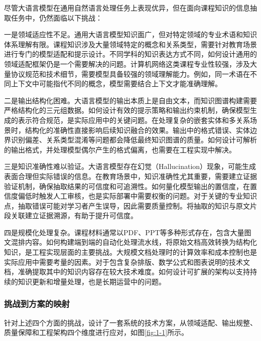 尽管大语言模型在通用自然语言处理任务上表现优异，但在面向课程知识的信息抽取任务中，仍然面临以下挑战：

一是领域适应性不足。通用大语言模型知识面广，但对特定领域的专业术语和知识体系理解有限。课程知识涉及大量领域特定的概念和关系类型，需要针对教育场景进行专门的模型适配和提示设计。不同学科的知识表达方式不同，如何设计通用的领域适配框架仍是一个需要解决的问题。计算机网络这类课程专业性较强，涉及大量协议规范和技术细节，需要模型具备较强的领域理解能力。例如，同一术语在不同上下文中可能指代不同的概念，模型需要结合上下文才能准确理解。

二是输出结构化困难。大语言模型的输出本质上是自由文本，而知识图谱构建需要严格结构化的三元组数据。如何设计有效的提示策略和输出约束机制，确保模型生成的表示符合规范，是实际应用中的关键问题。在处理复杂的嵌套实体和多关系场景时，结构化的准确性直接影响后续知识融合的效果。输出中的格式错误、实体边界识别偏差、关系类型混淆等问题都会降低最终知识图谱的质量。如何设计可解析的输出格式，并处理模型偶尔产生的格式偏离，也需要在工程实现中解决。

三是知识准确性难以验证。大语言模型存在幻觉（Hallucination）现象，可能生成表面合理但实际错误的信息。在教育场景中，知识准确性尤其重要，需要建立证据验证机制，确保抽取结果的可信度和可追溯性。如何量化模型输出的置信度，在置信度偏低时触发人工审核，也是实际部署中需要权衡的问题。对于关键的专业知识点，抽取错误可能对学习者产生误导，因此需要质量控制。将抽取的知识与原文片段关联建立证据溯源，有助于提升可信度。

四是规模化处理复杂。课程材料通常以PDF、PPT等多种形式存在，包含大量图文混排内容。如何构建端到端的自动化处理流水线，将原始文档高效转换为结构化知识，是工程实现层面的主要挑战。大规模文档处理时的计算效率和成本控制也是实际应用中需要考量的因素。对于包含复杂排版、数学公式和图表说明的技术文档，准确提取其中的知识内容存在较大技术难度。如何设计可扩展的架构以支持持续的知识更新和增量处理，也是长期运营中的问题。

\subsubsection{挑战到方案的映射}

针对上述四个方面的挑战，设计了一套系统的技术方案，从领域适配、输出规整、质量保障和工程架构四个维度进行应对，如图\ref{fig:1-1}所示。

